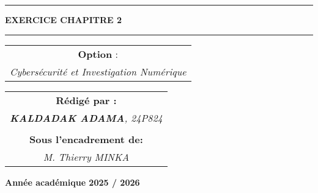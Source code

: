 \documentclass[memoire, 12pt]{report}
\begin{document}
\begin{titlepage}
\begin{center}
		\vspace{0.5cm}
		\begin{tabular}{l*{40}{@{\hskip 3.5cm}c@{\hskip5cm}} p{3.5cm} r}
		\end{tabular}
		
		\noindent\rule{\textwidth}{0.7mm}
		\Large{{\textbf{EXERCICE CHAPITRE 2}}}\\
		\noindent\rule{\textwidth}{0.7mm}
	\end{center}


        \vspace{0.5cm}
	\begin{center}
	\begin{tabular}{c}
		
		\vspace{0.1cm}
		\normalsize
	
	
		\vspace{0.1cm}
		\normalsize\textbf{Option }:\\
		\normalsize				
		\textsl{Cybersécurité et Investigation Numérique}
		
	\end{tabular}
	\end{center}
		
	\begin{center}
		\normalsize %
		\begin{tabular}{c}
			\vspace{0.07cm}
			\hspace{0.02cm} \textbf{\textbf{Rédigé par :}}\\
			\hspace{0.02cm} \textsl{\textbf{KALDADAK ADAMA}, 24P824}\\\\
			\vspace{0.1cm}
			\hspace{0.02cm} \textbf{Sous l'encadrement de:}\\
			\hspace{0.02cm} \textsl{M. Thierry MINKA}\\
				
               
		\end{tabular}
	\end{center}
    
	\vspace{4cm}
	\begin{center}
		\textbf{Année académique 2025 / 2026}
	\end{center}
		
	\vspace{-1.4cm}
	
		
	\vfill%
	
\end{titlepage}
\end{document}
